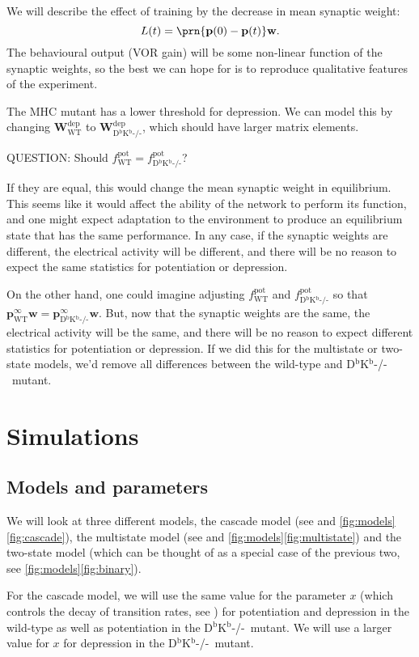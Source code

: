 \documentclass[12pt]{article}
\newcommand{\pr}{\mathbf{p}}
\newcommand{\eq}{\pr^\infty}
\newcommand{\w}{\mathbf{w}}
\newcommand{\W}{\mathbf{W}}
\newcommand{\pot}{^{\text{pot}}}
\newcommand{\dep}{^{\text{dep}}}
\newcommand{\wt}{_{\text{WT}}}
\newcommand{\ko}{_{\text{D$^\mathrm{b}$K$^\mathrm{b}$-/-}}}
\newcommand{\KO}{D$^\mathrm{b}$K$^\mathrm{b}$-/-}
\begin{document}
We will describe the effect of training by the decrease in mean synaptic weight:
%
\begin{equation}\label{eq:learning}
  L(t) = \prn{\pr(0)-\pr(t)}\w.
\end{equation}
%
The behavioural output (VOR gain) will be some non-linear function of the synaptic weights, so the best we can hope for is to reproduce qualitative features of the experiment.

The MHC mutant has a lower threshold for depression.
We can model this by changing $\W\dep\wt$ to $\W\dep\ko$, which should have larger matrix elements.

QUESTION: Should $f\pot\wt=f\pot\ko$?

If they are equal, this would change the mean synaptic weight in equilibrium.
This seems like it would affect the ability of the network to perform its function, and one might expect adaptation to the environment to produce an equilibrium state that has the same performance.
In any case, if the synaptic weights are different, the electrical activity will be different, and there will be no reason to expect the same statistics for potentiation or depression.

On the other hand, one could imagine adjusting $f\pot\wt$ and $f\pot\ko$ so that $\eq\wt\w = \eq\ko\w$.
But, now that the synaptic weights are the same, the electrical activity will be the same, and there will be no reason to expect different statistics for potentiation or depression.
If we did this for the multistate or two-state models, we'd remove all differences between the wild-type and \KO\ mutant.


\section{Simulations}\label{sec:sims}

\subsection{Models and parameters}

We will look at three different models, the cascade model (see \cite{Fusi2005cascade} and \autoref{fig:models}\ref{fig:cascade}), the multistate model (see \cite{amit1994learning,Fusi2007multistate} and \autoref{fig:models}\ref{fig:multistate}) and the two-state model (which can be thought of as a special case of the previous two, see \autoref{fig:models}\ref{fig:binary}).

For the cascade model, we will use the same value for the parameter $x$ (which controls the decay of transition rates, see \cite{Fusi2005cascade}) for potentiation and depression in the wild-type as well as potentiation in the \KO\ mutant.
We will use a larger value for $x$ for depression in the \KO\ mutant.
\end{document}

